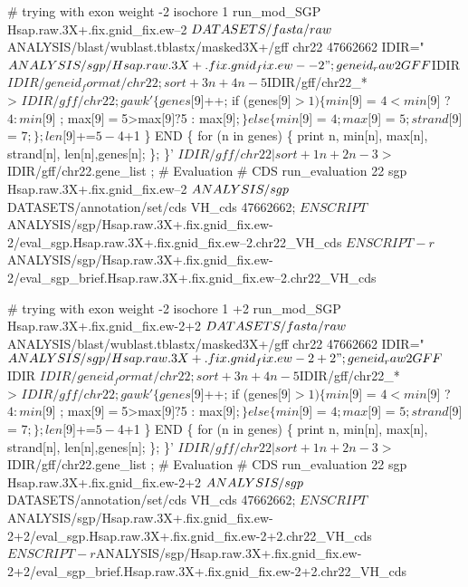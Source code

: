 \documentclass[11pt]{article}
\def\nwendcode{\endtrivlist \endgroup} %
\let\nwdocspar=\par                    %
\begin{document}
# trying with exon weight -2 isochore 1
run_mod_SGP Hsap.raw.3X+.fix.gnid_fix.ew--2 $DATASETS/fasta/raw \\
       $ANALYSIS/blast/wublast.tblastx/masked3X+/gff chr22 47662662
IDIR="$ANALYSIS/sgp/Hsap.raw.3X+.fix.gnid_fix.ew--2" ;
geneid_raw2GFF $IDIR $IDIR/geneid_format/chr22 ;
sort +3n +4n -5 $IDIR/gff/chr22_* \\
              > $IDIR/gff/chr22 ; 
gawk '\{
      genes[$9]++;
      if (genes[$9]>1) \{
        min[$9] = $4<min[$9] ? $4 : min[$9] ;
        max[$9] = $5>max[$9] ? $5 : max[$9] ;
      \} else \{
        min[$9] = $4 ;
        max[$9] = $5 ;
        strand[$9] = $7;
      \};
      len[$9]+=$5-$4+1
    \}
    END \{
      for (n in genes) \{
        print n, min[n], max[n], strand[n], len[n],genes[n];
      \};
    \}' $IDIR/gff/chr22 | sort +1n +2n -3 > $IDIR/gff/chr22.gene_list ;
# Evaluation 
# CDS
run_evaluation 22 sgp Hsap.raw.3X+.fix.gnid_fix.ew--2 $ANALYSIS/sgp \\
     $DATASETS/annotation/set/cds VH_cds 47662662;
$ENSCRIPT  $ANALYSIS/sgp/Hsap.raw.3X+.fix.gnid_fix.ew-2/eval_sgp.Hsap.raw.3X+.fix.gnid_fix.ew--2.chr22_VH_cds
$ENSCRIPT -r $ANALYSIS/sgp/Hsap.raw.3X+.fix.gnid_fix.ew-2/eval_sgp_brief.Hsap.raw.3X+.fix.gnid_fix.ew--2.chr22_VH_cds

# trying with exon weight -2 isochore 1 +2
run_mod_SGP Hsap.raw.3X+.fix.gnid_fix.ew-2+2 $DATASETS/fasta/raw \\
       $ANALYSIS/blast/wublast.tblastx/masked3X+/gff chr22 47662662
IDIR="$ANALYSIS/sgp/Hsap.raw.3X+.fix.gnid_fix.ew-2+2" ;
geneid_raw2GFF $IDIR $IDIR/geneid_format/chr22 ;
sort +3n +4n -5 $IDIR/gff/chr22_* \\
              > $IDIR/gff/chr22 ; 
gawk '\{
      genes[$9]++;
      if (genes[$9]>1) \{
        min[$9] = $4<min[$9] ? $4 : min[$9] ;
        max[$9] = $5>max[$9] ? $5 : max[$9] ;
      \} else \{
        min[$9] = $4 ;
        max[$9] = $5 ;
        strand[$9] = $7;
      \};
      len[$9]+=$5-$4+1
    \}
    END \{
      for (n in genes) \{
        print n, min[n], max[n], strand[n], len[n],genes[n];
      \};
    \}' $IDIR/gff/chr22 | sort +1n +2n -3 > $IDIR/gff/chr22.gene_list ;
# Evaluation 
# CDS
run_evaluation 22 sgp Hsap.raw.3X+.fix.gnid_fix.ew-2+2 $ANALYSIS/sgp \\
     $DATASETS/annotation/set/cds VH_cds 47662662;
$ENSCRIPT  $ANALYSIS/sgp/Hsap.raw.3X+.fix.gnid_fix.ew-2+2/eval_sgp.Hsap.raw.3X+.fix.gnid_fix.ew-2+2.chr22_VH_cds
$ENSCRIPT -r $ANALYSIS/sgp/Hsap.raw.3X+.fix.gnid_fix.ew-2+2/eval_sgp_brief.Hsap.raw.3X+.fix.gnid_fix.ew-2+2.chr22_VH_cds
\nwendcode{}\nwdocspar
\end{document}
